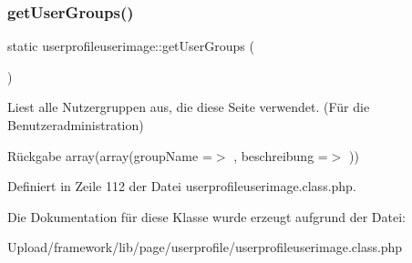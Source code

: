 \mbox{\label{classuserprofileuserimage_af230bfd3cb88ca421bb7fb94946c1c4f}} 
\subsubsection{\texorpdfstring{get\+User\+Groups()}{getUserGroups()}}
{\footnotesize\ttfamily static userprofileuserimage\+::get\+User\+Groups (\begin{DoxyParamCaption}{ }\end{DoxyParamCaption})\hspace{0.3cm}{\ttfamily [static]}}

Liest alle Nutzergruppen aus, die diese Seite verwendet. (Für die Benutzeradministration) \begin{DoxyReturn}{Rückgabe}
array(array(\textquotesingle{}group\+Name\textquotesingle{} =$>$ \textquotesingle{}\textquotesingle{}, \textquotesingle{}beschreibung\textquotesingle{} =$>$ \textquotesingle{}\textquotesingle{})) 
\end{DoxyReturn}


Definiert in Zeile 112 der Datei userprofileuserimage.\+class.\+php.



Die Dokumentation für diese Klasse wurde erzeugt aufgrund der Datei\+:\begin{DoxyCompactItemize}
\item 
Upload/framework/lib/page/userprofile/userprofileuserimage.\+class.\+php\end{DoxyCompactItemize}
